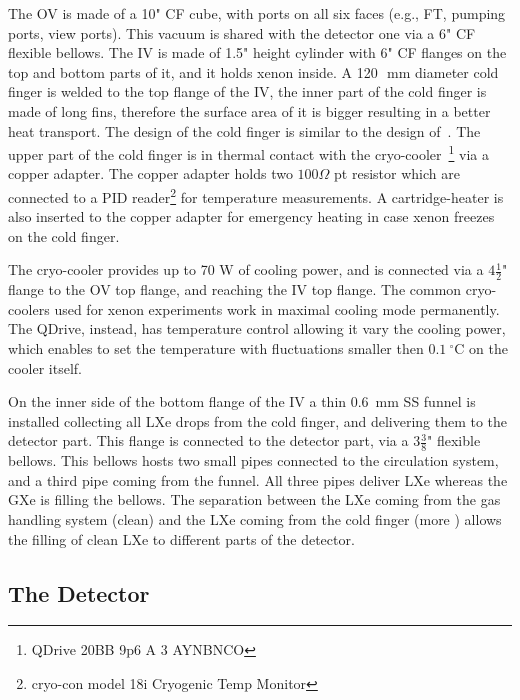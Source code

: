 The OV is made of a 10" CF cube, with ports on all six faces (e.g., FT, pumping ports, 
view ports). This vacuum is shared with the detector one via a 6" CF flexible bellows.
The IV is made of 1.5" height cylinder with 6" CF flanges on the top and bottom parts of it, 
and it holds xenon inside. A 120~\,mm diameter cold finger is welded to the top flange of the IV, 
the inner part of the cold finger is made of long fins, therefore the surface area of it is bigger 
resulting in a better heat transport. The design of the cold finger is similar to the design 
of~\cite{xe100_instr2012}. The upper part of the cold finger is in thermal contact with the 
cryo-cooler~\footnote{QDrive 20BB 9p6 A 3 AYNBNCO} via a copper adapter. The copper adapter 
holds two $100\Omega$ pt resistor which are connected to a PID reader\footnote{cryo-con model 
18i Cryogenic Temp Monitor} for temperature measurements. A cartridge-heater 
is also inserted to the copper adapter for emergency heating in case xenon freezes on the 
cold finger. 

The cryo-cooler provides up to 70 W of cooling power, and is connected via a $4\frac{1}{2}$" 
flange to the OV top flange, and reaching the IV top flange. The common cryo-coolers used for 
xenon experiments work in maximal cooling mode permanently. The QDrive, instead, has 
temperature control allowing it vary the cooling power, which enables to set the temperature 
with fluctuations smaller then $0.1~\mathrm{^{\circ}C}$ on the cooler itself.

On the inner side of the bottom flange of the IV a thin 0.6~mm SS funnel is installed 
collecting all LXe drops from the cold finger, and delivering them to the  detector part. 
This flange is connected to the detector part, via a $3\frac{3}{8}$" flexible bellows. This 
bellows hosts two small pipes connected to the circulation system, and a third pipe coming 
from the funnel. All three pipes deliver LXe whereas the GXe is filling the bellows. The 
separation between the LXe coming from the gas handling system (clean) and the LXe coming 
from the cold finger (more ) allows the filling of clean LXe to 
different parts of 
the detector. 

\subsection{The Detector}
\label{subsec:det}
 
